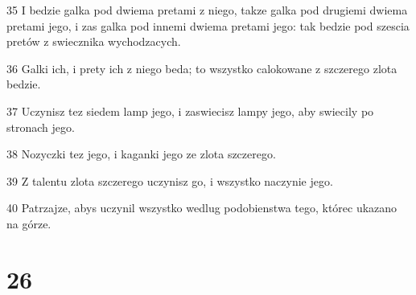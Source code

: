 \par 35 I bedzie galka pod dwiema pretami z niego, takze galka pod drugiemi dwiema pretami jego, i zas galka pod innemi dwiema pretami jego: tak bedzie pod szescia pretów z swiecznika wychodzacych.
\par 36 Galki ich, i prety ich z niego beda; to wszystko calokowane z szczerego zlota bedzie.
\par 37 Uczynisz tez siedem lamp jego, i zaswiecisz lampy jego, aby swiecily po stronach jego.
\par 38 Nozyczki tez jego, i kaganki jego ze zlota szczerego.
\par 39 Z talentu zlota szczerego uczynisz go, i wszystko naczynie jego.
\par 40 Patrzajze, abys uczynil wszystko wedlug podobienstwa tego, którec ukazano na górze.

\chapter{26}

